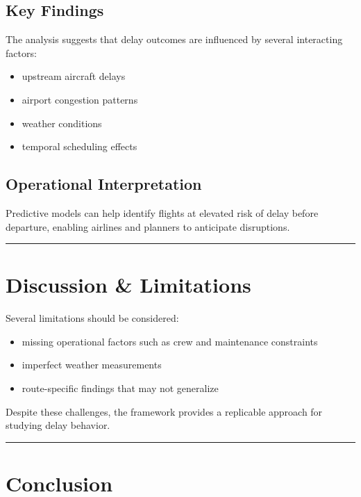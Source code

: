 \documentclass[
  letterpaper,
  DIV=11,
  numbers=noendperiod]{scrartcl}
\providecommand{\tightlist}{%
  \setlength{\itemsep}{0pt}\setlength{\parskip}{0pt}}
\begin{document}
\subsection{Key Findings}\label{key-findings}

The analysis suggests that delay outcomes are influenced by several
interacting factors:

\begin{itemize}
\tightlist
\item
  upstream aircraft delays
\item
  airport congestion patterns
\item
  weather conditions
\item
  temporal scheduling effects
\end{itemize}

\subsection{Operational
Interpretation}\label{operational-interpretation}

Predictive models can help identify flights at elevated risk of delay
before departure, enabling airlines and planners to anticipate
disruptions.

\begin{center}\rule{0.5\linewidth}{0.5pt}\end{center}

\section{Discussion \& Limitations}\label{discussion-limitations}

Several limitations should be considered:

\begin{itemize}
\tightlist
\item
  missing operational factors such as crew and maintenance constraints
\item
  imperfect weather measurements
\item
  route-specific findings that may not generalize
\end{itemize}

Despite these challenges, the framework provides a replicable approach
for studying delay behavior.

\begin{center}\rule{0.5\linewidth}{0.5pt}\end{center}

\section{Conclusion}\label{conclusion}
\end{document}
